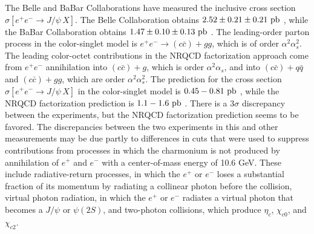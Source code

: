 The Belle and BaBar Collaborations have measured the inclusive cross
section $\sigma[e^+e^-\rightarrow J/\psi\, X]$. The Belle Collaboration
obtains $2.52\pm 0.21\pm 0.21\hbox{~pb}$ \cite{Abe:2001za}, while
the BaBar Collaboration obtains $1.47\pm 0.10\pm 0.13\hbox{~pb}$
\cite{Aubert:2001pd}. The leading-order parton process in the
color-singlet model is $e^+ e^- \to (c \bar c) + gg$, which is of order
$\alpha^2 \alpha_s^2$. The leading color-octet contributions in the
NRQCD factorization approach come from $e^+ e^-$ annihilation into $(c
\bar c) + g$, which is order $\alpha^2 \alpha_s$, and into $(c \bar c) +
q \bar q$ and $(c \bar c) + g g$, which are order $\alpha^2 \alpha_s^2$.
The prediction for the cross section $\sigma[e^+e^-\rightarrow
J/\psi\,X]$ in the color-singlet model is $0.45-0.81\hbox{~pb}$
\cite{Cho:1996cg,Yuan:1996ep,Yuan:1997sn,Schuler:1998az}, while the
NRQCD factorization prediction is $1.1-1.6\hbox{~pb}$
\cite{Yuan:1996ep,Yuan:1997sn,Schuler:1998az}. There is a $3\sigma$
discrepancy between the experiments, but the NRQCD factorization
prediction seems to be favored.
The discrepancies between the two experiments in this and other 
measurements may be due partly to differences in cuts that were used 
to suppress contributions from processes in which the charmonium 
is not produced by annihilation of $e^+$ and $e^-$ with a center-of-mass 
energy of 10.6 GeV.  These include radiative-return processes, 
in which the $e^+$ or $e^-$ loses a substantial fraction of its 
momentum by radiating a collinear photon before the collision, 
virtual photon radiation, in which the $e^+$ or $e^-$ radiates 
a virtual photon that becomes a $J/\psi$ or $\psi(2S)$, 
and two-photon collisions, which produce $\eta_c$, $\chi_{c0}$, 
and $\chi_{c2}$. 


